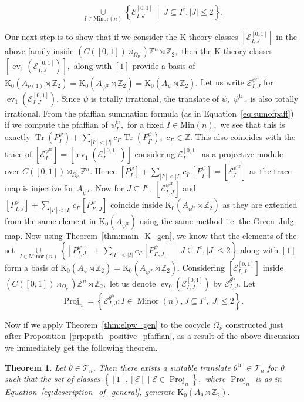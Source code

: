 \documentclass[9pt, BCOR=2mm]{amsart}
\numberwithin{equation}{section}
\numberwithin{equation}{section}
\newtheorem{theorem}{Theorem}[section]
\newcommand{\Z}{{\mathbb{Z}}}
\newcommand{\K}{\mathrm{K}} %
\newcommand{\suchthat}{\middle |}
\DeclareMathOperator{\Tr}{Tr}
\DeclareMathOperator{\ev}{ev}
\begin{document}
	 $$ \underset{I\in \mathrm{Minor}(n)}{\cup}\left\{\mathcal{E}_{I,J}^{[0,1]}~\suchthat ~J\subseteq I^c,|J|\le 2 \right\}.$$
	  
	  Our next step is to show that if we consider the K-theory classes $[\mathcal{E}_{I,J}^{[0,1]}]$ in the above family inside $(C([0,1])\rtimes_{\Omega_{\nu}}) \Z^n\rtimes \Z_2,$ then the K-theory classes $[\ev_1(\mathcal{E}_{I,J}^{[0,1]})],$ along with $[1]$ provide a basis of $\K_0(A_{\nu(1)}\rtimes\Z_2)=\K_0(A_{\psi^\mathrm{tr}}\rtimes\Z_2)=\K_0(A_{\psi}\rtimes\Z_2).$  Let us write $\mathcal{E}_{I,J}^{\psi^\mathrm{tr}}$ for $\ev_1(\mathcal{E}_{I,J}^{[0,1]}).$ Since $\psi$ is totally irrational, the translate of $\psi,$ $\psi^\mathrm{tr},$ is also totally irrational. From the pfaffian summation formula (as in Equation~\ref{eq:sumofpaff}) if we compute the pfaffian of $\psi^\mathrm{tr}_I,$ for a fixed $I\in \mathrm{Min}(n),$ we see that this is exactly $\Tr(P_I^\psi)+\underset{|I'|<|I|}{\sum} c_{I'}\Tr(P_{I'}^\psi),$ $c_{I'}\in \Z.$ This also coincides with the trace of $[\mathcal{E}_{I}^{\psi^\mathrm{tr}}]=[\ev_1(\mathcal{E}_{I}^{[0,1]})]$ considering $\mathcal{E}_{I}^{[0,1]}$ as a projective module over $C([0,1])\rtimes_{\Omega_{\nu}} \Z^n.$  Hence $[P_I^\psi]+\underset{|I'|<|I|}{\sum} c_{I'}[P_{I'}^\psi]= [\mathcal{E}_{I}^{\psi^\mathrm{tr}}]$ as the trace map is injective for $A_{\psi^\mathrm{tr}}.$ Now for $J\subseteq I^c,$ $[\mathcal{E}_{I,J}^{\psi^\mathrm{tr}}]$ and $[P_{I,J}^\psi]+\underset{|I'|<|I|}{\sum} c_{I'}[P_{I',J}^\psi]$ coincide inside $\K_0(A_{\psi^\mathrm{tr}}\rtimes\Z_2)$ as they are extended from the same element in $\K_0(A_{\psi^\mathrm{tr}})$ using the same method i.e. the Green--Julg map. Now using Theorem~\ref{thm:main_K_gen}, we know that the elements of the set $\underset{I\in \mathrm{Minor}(n)}{\cup}\left\{[P_{I,J}^\psi]+\sum_{|I'|<|I|}c_{I'}[P_{I',J}^\psi]~\suchthat ~J\subseteq I^c,|J|\le 2 \right\}$  along with $[1]$ form a basis of $\K_0(A_{\psi}\rtimes\Z_2)=\K_0(A_{\psi^\mathrm{tr}}\rtimes\Z_2).$  Considering $[\mathcal{E}_{I,J}^{[0,1]}]$ inside $(C([0,1])\rtimes_{\Omega_{\nu}}) \Z^n\rtimes \Z_2,$ let us denote $\ev_0(\mathcal{E}_{I,J}^{[0,1]})$ by $\mathcal{E}_{I,J}^{\theta^\mathrm{tr}}$. Let 
	  \begin{equation}\label{eq:description_of_general}
	  	\operatorname{Proj}_n=\left\{\mathcal{E}_{I, J}^{\theta^{\text {tr }}}: I \in \operatorname{Minor}(n), J \subseteq I^c,|J| \leq 2\right\}.
\end{equation}
	  
	  
	    Now if we apply Theorem~\ref{thm:elpw_gen} to the cocycle ${\Omega}_\nu$ constructed just after Proposition~\ref{prp:path_positive_pfaffian}, as a result of the above discussion we immediately get the following theorem. 
	  \begin{theorem}\label{thm:main_K_gen_proj} Let $\theta \in \mathcal{T}_n$. Then there exists a suitable translate $\theta^{\text {tr }} \in \mathcal{T}_n$ for $\theta$ such that the set of classes $\left\{[1],[\mathcal{E}] \mid \mathcal{E} \in \operatorname{Proj}_n\right\},$ where
$\operatorname{Proj}_n$ is as in Equation~\ref{eq:description_of_general}, generate $\K_0(A_{\theta}\rtimes \Z_2).$
	 \end{theorem}
	 
\end{document}
